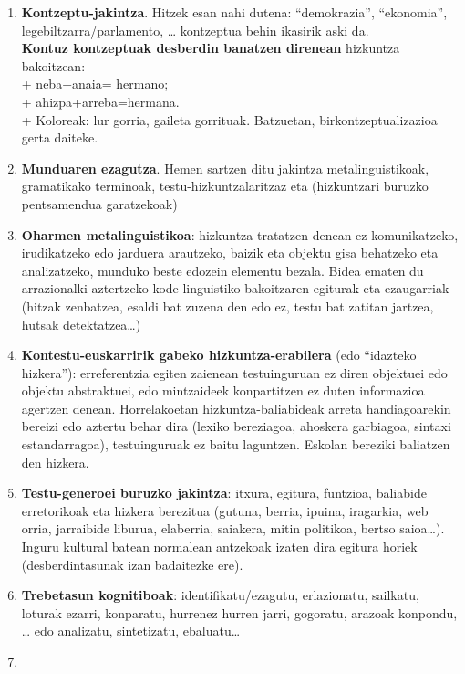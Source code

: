 \documentclass[
]{book}
\providecommand{\tightlist}{%
  \setlength{\itemsep}{0pt}\setlength{\parskip}{0pt}}
\begin{document}
\begin{enumerate}
\def\labelenumi{\arabic{enumi}.}
\tightlist
\item
  \textbf{Kontzeptu-jakintza}. Hitzek esan nahi dutena: ``demokrazia'', ``ekonomia'', legebiltzarra/parlamento, \ldots{} kontzeptua behin ikasirik aski da.\\
  \textbf{Kontuz kontzeptuak desberdin banatzen direnean} hizkuntza bakoitzean:\\
  + neba+anaia= hermano;\\
  + ahizpa+arreba=hermana.\\
  + Koloreak: lur gorria, gaileta gorrituak.
  Batzuetan, birkontzeptualizazioa gerta daiteke.\\
\item
  \textbf{Munduaren ezagutza}. Hemen sartzen ditu jakintza metalinguistikoak, gramatikako terminoak, testu-hizkuntzalaritzaz eta (hizkuntzari buruzko pentsamendua garatzekoak)
\item
  \textbf{Oharmen metalinguistikoa}: hizkuntza tratatzen denean ez komunikatzeko, irudikatzeko edo jarduera arautzeko, baizik eta objektu gisa behatzeko eta analizatzeko, munduko beste edozein elementu bezala. Bidea ematen du arrazionalki aztertzeko kode linguistiko bakoitzaren egiturak eta ezaugarriak (hitzak zenbatzea, esaldi bat zuzena den edo ez, testu bat zatitan jartzea, hutsak detektatzea\ldots)
\item
  \textbf{Kontestu-euskarririk gabeko hizkuntza-erabilera} (edo ``idazteko hizkera''): erreferentzia egiten zaienean testuinguruan ez diren objektuei edo objektu abstraktuei, edo mintzaideek konpartitzen ez duten informazioa agertzen denean. Horrelakoetan hizkuntza-baliabideak arreta handiagoarekin bereizi edo aztertu behar dira (lexiko bereziagoa, ahoskera garbiagoa, sintaxi estandarragoa), testuinguruak ez baitu laguntzen. Eskolan bereziki baliatzen den hizkera.
\item
  \textbf{Testu-generoei buruzko jakintza}: itxura, egitura, funtzioa, baliabide erretorikoak eta hizkera berezitua (gutuna, berria, ipuina, iragarkia, web orria, jarraibide liburua, elaberria, saiakera, mitin politikoa, bertso saioa\ldots). Inguru kultural batean normalean antzekoak izaten dira egitura horiek (desberdintasunak izan badaitezke ere).
\item
  \textbf{Trebetasun kognitiboak}: identifikatu/ezagutu, erlazionatu, sailkatu, loturak ezarri, konparatu, hurrenez hurren jarri, gogoratu, arazoak konpondu, \ldots{} edo analizatu, sintetizatu, ebaluatu\ldots{}
\item

\end{enumerate}
\end{document}
